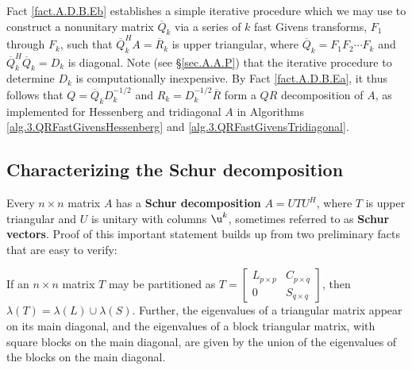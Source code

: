 \begin{figure*}[t]

\end{figure*}

\noindent 
Fact \ref{fact.A.D.B.Eb} establishes a simple iterative procedure which we may use
to construct a nonunitary matrix $\overline Q_k$ via a series of $k$ fast Givens transforms, $F_1$ through $F_k$, such that
$\overline Q_k^H A= \overline R_k$ is upper triangular, where $\overline Q_k=F_1 F_2 \cdots F_k$ and $\overline Q_k^H \overline Q_k= D_k$ is diagonal. 
Note (see \S \ref{sec.A.A.P}) that the iterative procedure to determine $D_{k}$ is computationally inexpensive. 
By Fact \ref{fact.A.D.B.Ea}, it thus follows that $Q=\overline Q_k D_k^{-1/2}$ and $R_k=D_k^{-1/2} \overline R$ form a $QR$ decomposition of $A$,
as implemented for Hessenberg and tridiagonal $A$ in
Algorithms \ref{alg.3.QRFastGivensHessenberg} and \ref{alg.3.QRFastGivensTridiagonal}.

\subsection{Characterizing the Schur decomposition}\label{sec.A.D.C}

Every $n\times n$ matrix $A$ has a {\bf Schur decomposition} $A=U T U^{H}$,
where $T$ is upper triangular and $U$ is unitary with columns $\u^k$, sometimes referred to as
{\bf Schur vectors}.  Proof of this
important statement builds up from two preliminary facts that are easy
to verify:\medskip

\begin{fact} \label{fact.A.D.C.A}
If an $n\times n$ matrix $T$ may be partitioned
as $T=\begin{bmatrix} L_{p\times p} & C_{p\times q} \\ 0 & S_{q \times q} \end{bmatrix}$, then $\lambda(T)=\lambda(L) \cup \lambda(S)$.
Further, the eigenvalues of a triangular matrix appear on its main diagonal,
and the eigenvalues of a block triangular matrix, with square blocks on the main diagonal, are given by the union of the eigenvalues of the blocks
on the main diagonal.
\end{fact}

